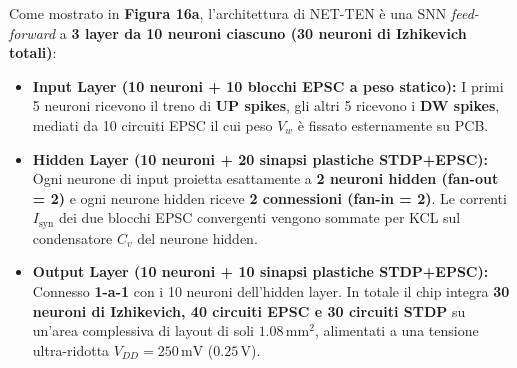 \documentclass[11pt,a4paper]{article}
\begin{document}
Come mostrato in \textbf{Figura 16a}, l'architettura di NET-TEN è una SNN \textit{feed-forward} a \textbf{3 layer da 10 neuroni ciascuno (30 neuroni di Izhikevich totali)}:
\begin{itemize}
  \item \textbf{Input Layer (10 neuroni + 10 blocchi EPSC a peso statico):} I primi 5 neuroni ricevono il treno di \textbf{UP spikes}, gli altri 5 ricevono i \textbf{DW spikes}, mediati da 10 circuiti EPSC il cui peso $V_w$ è fissato esternamente su PCB.
  \item \textbf{Hidden Layer (10 neuroni + 20 sinapsi plastiche STDP+EPSC):} Ogni neurone di input proietta esattamente a \textbf{2 neuroni hidden (fan-out = 2)} e ogni neurone hidden riceve \textbf{2 connessioni (fan-in = 2)}. Le correnti $I_{\text{syn}}$ dei due blocchi EPSC convergenti vengono sommate per KCL sul condensatore $C_v$ del neurone hidden.
  \item \textbf{Output Layer (10 neuroni + 10 sinapsi plastiche STDP+EPSC):} Connesso \textbf{1-a-1} con i 10 neuroni dell'hidden layer. In totale il chip integra \textbf{30 neuroni di Izhikevich, 40 circuiti EPSC e 30 circuiti STDP} su un'area complessiva di layout di soli \textbf{$1.08\,\text{mm}^2$}, alimentati a una tensione ultra-ridotta \textbf{$V_{DD} = 250\,\text{mV}$} ($0.25\,\text{V}$).
\end{itemize}
\end{document}
